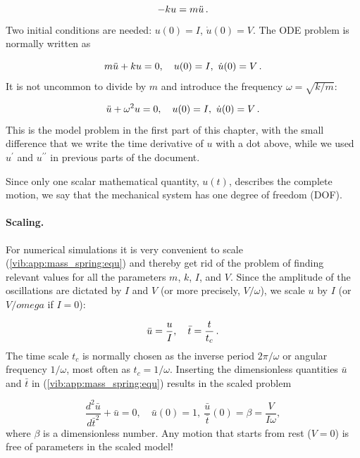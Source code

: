 \documentclass[%
oneside,                 %
final,                   %
10pt]{article}
\begin{document}
\[ -ku = m\ddot u\tp\]
Two initial conditions are needed: $u(0)=I$, $\dot u(0)=V$.
The ODE problem is normally written as

\begin{equation}
m\ddot u + ku = 0,\quad u(0)=I,\ \dot u(0)=V\tp
\label{vib:app:mass_spring:eqx}
\end{equation}
It is
not uncommon to divide by $m$
and introduce the frequency $\omega = \sqrt{k/m}$:

\begin{equation}
\ddot u + \omega^2 u = 0,\quad u(0)=I,\  \dot u(0)=V\tp
\label{vib:app:mass_spring:equ}
\end{equation}
This is the model problem in the first part of this chapter, with the
small difference that we write the time derivative of $u$ with a dot
above, while we used $u^{\prime}$ and $u^{\prime\prime}$ in previous
parts of the document.


Since only one scalar mathematical quantity, $u(t)$, describes the
complete motion, we say that the mechanical system has one degree of freedom
(DOF).

\paragraph{Scaling.}
For numerical simulations it is very convenient to scale (\ref{vib:app:mass_spring:equ}) and thereby get rid of the problem of finding relevant values
for all the parameters $m$, $k$, $I$, and $V$.
Since the amplitude of the oscillations are dictated by $I$ and $V$
(or more precisely, $V/\omega$), we scale $u$ by $I$ (or $V/omega$ if
$I=0$):

\[ \bar u = \frac{u}{I},\quad \bar t = \frac{t}{t_c}\tp\]
The time scale $t_c$ is normally chosen as the inverse period $2\pi/\omega$ or
angular frequency $1/\omega$, most often as $t_c=1/\omega$.
Inserting the dimensionless quantities $\bar u$ and $\bar t$ in
(\ref{vib:app:mass_spring:equ}) results in the scaled problem

\[ \frac{d^2\bar u}{d\bar t^2} + \bar u = 0,\quad \bar u(0)=1,\ \frac{\bar u}{\bar t}(0)=\beta = \frac{V}{I\omega},\]
where $\beta$ is a dimensionless number. Any motion that starts from rest
($V=0$) is free of parameters in the scaled model!
\end{document}
